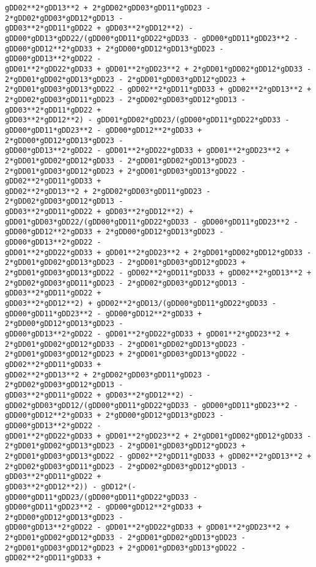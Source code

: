 \documentclass[landscape,letterpaper,10pt,english]{article}
\begin{document}
\begin{Verbatim}[commandchars=\\\{\}]
gDD02**2*gDD13**2 + 2*gDD02*gDD03*gDD11*gDD23 - 2*gDD02*gDD03*gDD12*gDD13 -
gDD03**2*gDD11*gDD22 + gDD03**2*gDD12**2) -
gDD00*gDD13*gDD22/(gDD00*gDD11*gDD22*gDD33 - gDD00*gDD11*gDD23**2 -
gDD00*gDD12**2*gDD33 + 2*gDD00*gDD12*gDD13*gDD23 - gDD00*gDD13**2*gDD22 -
gDD01**2*gDD22*gDD33 + gDD01**2*gDD23**2 + 2*gDD01*gDD02*gDD12*gDD33 -
2*gDD01*gDD02*gDD13*gDD23 - 2*gDD01*gDD03*gDD12*gDD23 +
2*gDD01*gDD03*gDD13*gDD22 - gDD02**2*gDD11*gDD33 + gDD02**2*gDD13**2 +
2*gDD02*gDD03*gDD11*gDD23 - 2*gDD02*gDD03*gDD12*gDD13 - gDD03**2*gDD11*gDD22 +
gDD03**2*gDD12**2) - gDD01*gDD02*gDD23/(gDD00*gDD11*gDD22*gDD33 -
gDD00*gDD11*gDD23**2 - gDD00*gDD12**2*gDD33 + 2*gDD00*gDD12*gDD13*gDD23 -
gDD00*gDD13**2*gDD22 - gDD01**2*gDD22*gDD33 + gDD01**2*gDD23**2 +
2*gDD01*gDD02*gDD12*gDD33 - 2*gDD01*gDD02*gDD13*gDD23 -
2*gDD01*gDD03*gDD12*gDD23 + 2*gDD01*gDD03*gDD13*gDD22 - gDD02**2*gDD11*gDD33 +
gDD02**2*gDD13**2 + 2*gDD02*gDD03*gDD11*gDD23 - 2*gDD02*gDD03*gDD12*gDD13 -
gDD03**2*gDD11*gDD22 + gDD03**2*gDD12**2) +
gDD01*gDD03*gDD22/(gDD00*gDD11*gDD22*gDD33 - gDD00*gDD11*gDD23**2 -
gDD00*gDD12**2*gDD33 + 2*gDD00*gDD12*gDD13*gDD23 - gDD00*gDD13**2*gDD22 -
gDD01**2*gDD22*gDD33 + gDD01**2*gDD23**2 + 2*gDD01*gDD02*gDD12*gDD33 -
2*gDD01*gDD02*gDD13*gDD23 - 2*gDD01*gDD03*gDD12*gDD23 +
2*gDD01*gDD03*gDD13*gDD22 - gDD02**2*gDD11*gDD33 + gDD02**2*gDD13**2 +
2*gDD02*gDD03*gDD11*gDD23 - 2*gDD02*gDD03*gDD12*gDD13 - gDD03**2*gDD11*gDD22 +
gDD03**2*gDD12**2) + gDD02**2*gDD13/(gDD00*gDD11*gDD22*gDD33 -
gDD00*gDD11*gDD23**2 - gDD00*gDD12**2*gDD33 + 2*gDD00*gDD12*gDD13*gDD23 -
gDD00*gDD13**2*gDD22 - gDD01**2*gDD22*gDD33 + gDD01**2*gDD23**2 +
2*gDD01*gDD02*gDD12*gDD33 - 2*gDD01*gDD02*gDD13*gDD23 -
2*gDD01*gDD03*gDD12*gDD23 + 2*gDD01*gDD03*gDD13*gDD22 - gDD02**2*gDD11*gDD33 +
gDD02**2*gDD13**2 + 2*gDD02*gDD03*gDD11*gDD23 - 2*gDD02*gDD03*gDD12*gDD13 -
gDD03**2*gDD11*gDD22 + gDD03**2*gDD12**2) -
gDD02*gDD03*gDD12/(gDD00*gDD11*gDD22*gDD33 - gDD00*gDD11*gDD23**2 -
gDD00*gDD12**2*gDD33 + 2*gDD00*gDD12*gDD13*gDD23 - gDD00*gDD13**2*gDD22 -
gDD01**2*gDD22*gDD33 + gDD01**2*gDD23**2 + 2*gDD01*gDD02*gDD12*gDD33 -
2*gDD01*gDD02*gDD13*gDD23 - 2*gDD01*gDD03*gDD12*gDD23 +
2*gDD01*gDD03*gDD13*gDD22 - gDD02**2*gDD11*gDD33 + gDD02**2*gDD13**2 +
2*gDD02*gDD03*gDD11*gDD23 - 2*gDD02*gDD03*gDD12*gDD13 - gDD03**2*gDD11*gDD22 +
gDD03**2*gDD12**2)) - gDD12*(-gDD00*gDD11*gDD23/(gDD00*gDD11*gDD22*gDD33 -
gDD00*gDD11*gDD23**2 - gDD00*gDD12**2*gDD33 + 2*gDD00*gDD12*gDD13*gDD23 -
gDD00*gDD13**2*gDD22 - gDD01**2*gDD22*gDD33 + gDD01**2*gDD23**2 +
2*gDD01*gDD02*gDD12*gDD33 - 2*gDD01*gDD02*gDD13*gDD23 -
2*gDD01*gDD03*gDD12*gDD23 + 2*gDD01*gDD03*gDD13*gDD22 - gDD02**2*gDD11*gDD33 +

\end{Verbatim}
\end{document}
